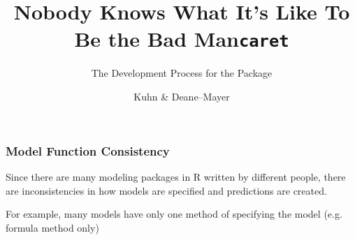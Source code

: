 \documentclass[12 pt]{beamer}\usepackage[]{graphicx}\usepackage[]{color}
\title{\large Nobody Knows What It's Like To Be the Bad Man}
\subtitle{The Development Process for the {\tt \pkg{caret}} Package}
\author[Subham Kuhn \& Deane--Mayer]
{%
   \texorpdfstring{
        \begin{columns}
            \column{.45\linewidth}
            \centering
            Max Kuhn\\
            Pfizer Global R$\&$D\\
            \href{mailto:max.kuhn@pfizer.com}{max.kuhn@pfizer.com}
            \column{.45\linewidth}
            \centering
            Zachary Deane--Mayer\\
            Cognius\\
            \href{mailto:zach.mayer@gmail.com}{zach.mayer@gmail.com}
        \end{columns}
   }
   {John Doe \& Jane Doe}
}
\date{}
\begin{document}
\begin{frame}[plain]
  \maketitle
\end{frame}

\title{\tt{caret}}
\author{Kuhn \& Deane--Mayer}


  \begin{frame}[fragile]
\frametitle{Model Function Consistency}

Since there are many modeling packages in R written by different people,
there are inconsistencies in how models are specified and
predictions are created.

\vspace{.15in}

For example, many models have only one method of specifying the model
(e.g. formula method only)


\end{frame}

\end{document}
